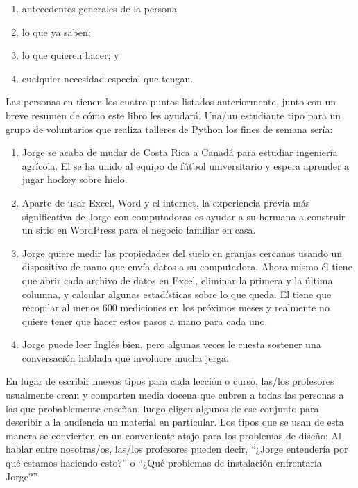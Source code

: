 \begin{enumerate}
 
\item
antecedentes generales de la persona
 
\item
lo que ya saben;
 
\item
lo que quieren hacer;
y
 
\item
cualquier necesidad especial que tengan.
 
\end{enumerate}
 Las personas en  tienen los cuatro puntos listados anteriormente,
junto con un breve resumen de cómo este libro les ayudará.
Una/un estudiante tipo para un grupo de voluntarios que realiza talleres de Python los fines de semana sería:
 
\begin{enumerate}
 
\item
 Jorge se acaba de mudar de Costa Rica a Canadá para estudiar ingeniería agrícola.
El se ha unido al equipo de fútbol universitario
y espera aprender a jugar hockey sobre hielo.
 
\item
Aparte de usar Excel, Word y el internet,
la experiencia previa más significativa de Jorge con computadoras
es ayudar a su hermana a construir un sitio en WordPress
para el negocio familiar en casa.
 
 
\item
  Jorge quiere medir las propiedades del suelo en granjas cercanas
usando un dispositivo de mano que envía datos a su computadora.
Ahora mismo él tiene que abrir cada archivo de datos en Excel,
eliminar la primera y la última columna,
y calcular algunas estadísticas sobre lo que queda.
El tiene que recopilar al menos 600 mediciones en los próximos meses
y realmente no quiere tener que hacer estos pasos a mano para cada uno.
 
\item
Jorge puede leer Inglés bien,
pero algunas veces le cuesta sostener una conversación hablada que involucre mucha jerga.
 
\end{enumerate}
 
En lugar de escribir nuevos tipos para cada lección o curso,
las/los profesores usualmente crean y comparten media docena
que cubren a todas las personas a las que probablemente enseñan,
luego eligen algunos de ese conjunto para describir a la audiencia un material en particular.
Los tipos que se usan de esta manera se convierten en un conveniente atajo para los problemas de diseño:
Al hablar entre nosotras/os,
las/los profesores pueden decir,
``¿Jorge entendería por qué estamos haciendo esto?''
o
``¿Qué problemas de instalación enfrentaría Jorge?''
 
